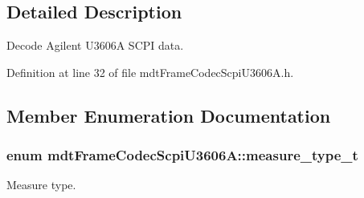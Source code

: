 \subsection{Detailed Description}
Decode Agilent U3606A SCPI data. 

Definition at line 32 of file mdtFrameCodecScpiU3606A.h.



\subsection{Member Enumeration Documentation}
\hypertarget{classmdt_frame_codec_scpi_u3606_a_a3d7a1de14d77797a08e3d2991fa9f004}{
\subsubsection[{measure\_\-type\_\-t}]{\setlength{\rightskip}{0pt plus 5cm}enum {\bf mdtFrameCodecScpiU3606A::measure\_\-type\_\-t}}}
\label{classmdt_frame_codec_scpi_u3606_a_a3d7a1de14d77797a08e3d2991fa9f004}


Measure type. 

